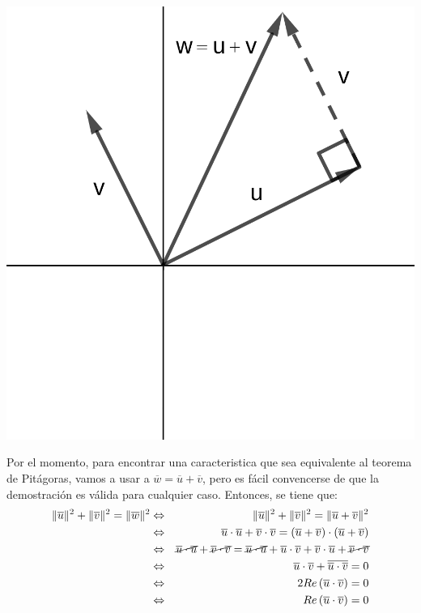 \documentclass[a4paper,11pt]{article}
\theoremstyle{teoremas}
\theoremstyle{ejemplos}
\theoremstyle{definiciones}
\theoremstyle{lemas}
\begin{document}
\begin{center}
 \includegraphics[scale=0.8]{apuntes_algebra_lineal_01.png}
\end{center}
Por el momento, para encontrar una caracteristica que sea equivalente al teorema de Pit\'agoras, vamos a usar a $\overline{w} = \overline{u}+ \overline{v}$, pero es f\'acil convencerse de que la demostraci\'on es v\'alida para cualquier caso. Entonces, se tiene que:
\begin{eqnarray*}
 \lVert \overline{u} \rVert^2 + \lVert \overline{v} \rVert^2 = \lVert \overline{w} \rVert^2 & \Leftrightarrow & \lVert \overline{u} \rVert^2 + \lVert \overline{v} \rVert^2 = \lVert \overline{u} + \overline{v} \rVert^2 \\ 
  & \Leftrightarrow & \overline{u}\cdot \overline{u} + \overline{v}\cdot \overline{v} = \left( \overline{u} + \overline{v} \right)\cdot\left( \overline{u} + \overline{v} \right) \\
  & \Leftrightarrow & \cancel{\overline{u}\cdot \overline{u}} + \cancel{\overline{v}\cdot \overline{v}} = 
  \cancel{\overline{u}\cdot \overline{u}} + \overline{u}\cdot \overline{v}+ \overline{v}\cdot \overline{u} + \cancel{\overline{v} \cdot\overline{v}} \\
  & \Leftrightarrow & \overline{u}\cdot \overline{v} + \overline{\overline{u}\cdot \overline{v}} = 0 \\
  & \Leftrightarrow & 2Re\left( \overline{u}\cdot \overline{v} \right) = 0 \\ 
  & \Leftrightarrow & Re\left( \overline{u}\cdot \overline{v} \right) = 0
\end{eqnarray*}
\end{document}

